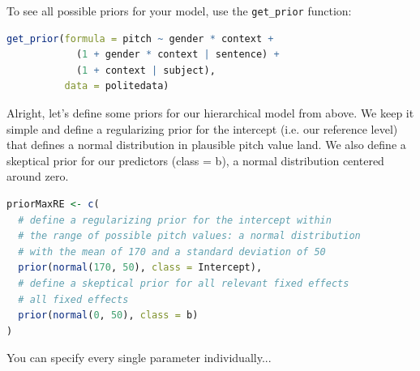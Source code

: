 \documentclass[nobib]{tufte-handout}
\newcommand{\tr}[1]{\textcolor{DarkOrange}{[tr: #1]}}
\begin{document}
To see all possible priors for your model, use the \texttt{get\_prior} function:

\begin{minipage}[]{1.3\textwidth}
\begin{lstlisting}[language=R]
get_prior(formula = pitch ~ gender * context +
            (1 + gender * context | sentence) +
            (1 + context | subject),
          data = politedata)
\end{lstlisting}
\end{minipage}

Alright, let's define some priors for our hierarchical model from above. We keep it simple and define a regularizing prior for the intercept (i.e. our reference level) that defines a normal distribution in plausible pitch value land. We also define a skeptical prior for our predictors (class = b), a normal distribution centered around zero.  

\begin{minipage}[]{1.3\textwidth}
\begin{lstlisting}[language=R]
priorMaxRE <- c(
  # define a regularizing prior for the intercept within 
  # the range of possible pitch values: a normal distribution 
  # with the mean of 170 and a standard deviation of 50
  prior(normal(170, 50), class = Intercept),
  # define a skeptical prior for all relevant fixed effects
  # all fixed effects
  prior(normal(0, 50), class = b)
)
\end{lstlisting}
\end{minipage}

You can specify every single parameter individually...












\printbibliography[heading=bibintoc]
\end{document}
